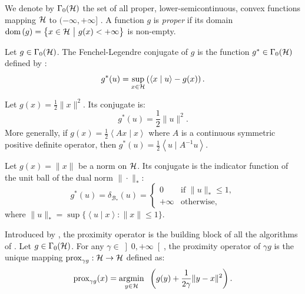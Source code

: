 \documentclass[a4paper,11pt]{article}
\renewcommand{\leq}{\ensuremath{\leqslant}}
\newcommand{\scal}[2]{{\left\langle{{#1}\mid{#2}}\right\rangle}}
\newcommand{\menge}[2]{\big\{{#1}~\big |~{#2}\big\}}
\newcommand{\RPP}{\ensuremath{\left]0,+\infty\right[}}
\newcommand{\pinf}{\ensuremath{{+\infty}}}
\newcommand{\dom}{\ensuremath{\text{\rm dom}\,}}
\newcommand{\prox}{\ensuremath{\text{\rm prox}}}
\newcommand{\argmind}[2]{\ensuremath{\underset{\substack{{#1}}}%
{\mathrm{argmin}}\;\;#2 }}
\theoremstyle{plain}{\theorembodyfont{\rmfamily}%
\newtheorem{proposition}[theorem]{Proposition}}
\theoremstyle{plain}{\theorembodyfont{\rmfamily}%
\newtheorem{notation}[theorem]{Notation}}
\theoremstyle{plain}{\theorembodyfont{\rmfamily}%
\newtheorem{assumption}[theorem]{Assumption}}
\theoremstyle{plain}{\theorembodyfont{\rmfamily}%
\newtheorem{problem}[theorem]{Problem}}
\theoremstyle{plain}{\theorembodyfont{\rmfamily}%
\newtheorem{example}[theorem]{Example}}
\theoremstyle{plain}{\theorembodyfont{\rmfamily}%
\newtheorem{remark}[theorem]{Remark}}
\theoremstyle{plain}{\theorembodyfont{\rmfamily}%
\newtheorem{definition}[theorem]{Definition}}
\theoremstyle{plain}{\theorembodyfont{\rmfamily}%
\newtheorem{question}[theorem]{Question}}
\numberwithin{equation}{section}
\begin{document}
\begin{definition}
We denote by $\Gamma_0({\mathcal{H}})$ the set of all proper, lower-semicontinuous, convex functions mapping ${\mathcal{H}}$ to $(-\infty, +\infty]$ \cite[Chapter 9]{bauschke2017convex}. A function $g$ is \textit{proper} if its domain $\dom (g) = \menge{x \in \Hc}{g(x) < \pinf}$ is non-empty.
\end{definition}

\begin{definition}
Let $g \in \Gamma_0({\mathcal{H}})$. The Fenchel-Legendre conjugate of $g$ is the function $g^* \in \Gamma_0({\mathcal{H}})$ defined by \cite{bauschke2017convex}:
\begin{equation}
    g^*(u) = \sup_{x \in \Hc} \left( \scal{x}{u} - g(x) \right).
\end{equation}
\end{definition}

\begin{example}
Let $g(x) = \frac{1}{2}\|x\|^2$. Its conjugate is:
\begin{equation}
    g^*(u) = \frac{1}{2}\|u\|^2.
\end{equation}
More generally, if $g(x) = \frac{1}{2}\scal{Ax}{x}$ where $A$ is a continuous symmetric positive definite operator, then $g^*(u) = \frac{1}{2}\scal{u}{A^{-1}u}$.
\end{example}

\begin{example}
Let $g(x) = \|x\|$ be a norm on ${\mathcal{H}}$. Its conjugate is the indicator function of the unit ball of the dual norm $\|\cdot\|_*$:
\begin{equation}
    g^*(u) = \delta_{\mathcal{B}_*}(u) =
    \begin{cases}
    0 & \text{if } \|u\|_* \leq 1, \\
    +\infty & \text{otherwise,}
    \end{cases}
\end{equation}
where $\|u\|_* = \sup \{ \scal{u}{x} : \|x\| \leq 1 \}$.
\end{example}

\begin{definition}\label{proximal_operator}
Introduced by \cite{moreau1965proximite}, the proximity operator is the building block of all the algorithms of . Let $g \in \Gamma_0({\mathcal{H}})$. For any $\gamma \in \RPP$, the proximity operator of $\gamma g$ is the unique mapping $\prox_{\gamma g}: \Hc \to \Hc$ defined as:
\begin{equation}
    \prox_{\gamma g}(x) = \argmind{y \in \Hc}{\left( g(y) + \frac{1}{2\gamma} \| y - x \|^2 \right)}.
\end{equation}
\end{definition}
\end{document}
